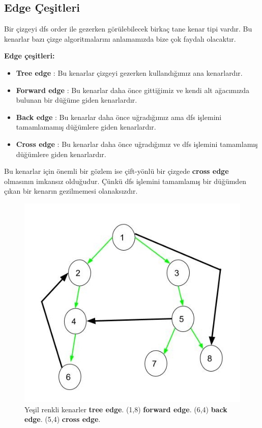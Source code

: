 \documentclass[12pt]{article}
\begin{document}
    \subsection{Edge Çeşitleri}
    Bir çizgeyi dfs order ile gezerken görülebilecek birkaç tane kenar tipi vardır. Bu kenarlar bazı çizge algoritmalarını anlamamızda bize çok faydalı olacaktır.
    
    \textbf{Edge çeşitleri:}
\begin{itemize}
	\item \textbf{Tree edge} : Bu kenarlar çizgeyi gezerken kullandığımız ana kenarlardır.
	\item \textbf{Forward edge} : Bu kenarlar daha önce gittiğimiz ve kendi alt ağacımızda bulunan bir düğüme giden kenarlardır.
	\item \textbf{Back edge} : Bu kenarlar daha önce uğradığımız ama dfs işlemini tamamlamamış düğümlere giden kenarlardır.
	\item \textbf{Cross edge} : Bu kenarlar daha önce uğradığımız ve dfs işlemini tamamlamış düğümlere giden kenarlardır.
\end{itemize}

Bu kenarlar için önemli bir gözlem ise çift-yönlü bir çizgede \textbf{cross edge} olmasının imkansız olduğudur. Çünkü dfs işlemini tamamlamış bir düğümden çıkan bir kenarın gezilmemesi olanaksızdır.

\begin{figure}[H]
\centering
\includegraphics[width=\linewidth/4*2]{edge-cesitleri.png}
\caption{Yeşil renkli kenarler \textbf{tree edge}. (1,8) \textbf{forward edge}. (6,4) \textbf{back edge}. (5,4) \textbf{cross edge}.}
\label{fig:prime1}
\end{figure}
\end{document}

